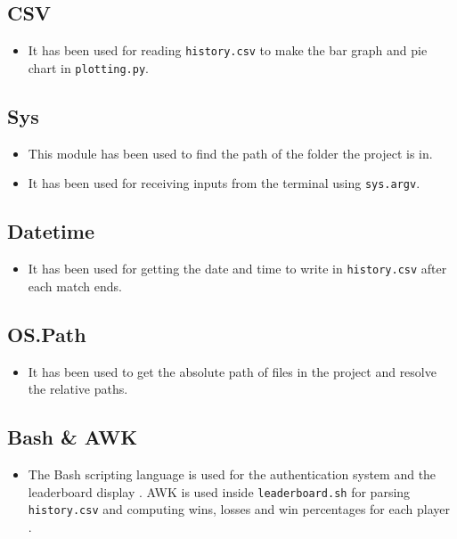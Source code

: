 \documentclass[12pt,a4paper]{article}
\begin{document}
\subsection{CSV}
\begin{itemize}
    \item It has been used for reading \texttt{history.csv} to make the bar graph and pie chart in \texttt{plotting.py}.
\end{itemize}

\subsection{Sys}
\begin{itemize}
    \item This module has been used to find the path of the folder the project is in.
    \item It has been used for receiving inputs from the terminal using \texttt{sys.argv}.

\end{itemize}

\subsection{Datetime}
\begin{itemize}
    \item It has been used for getting the date and time to write in \texttt{history.csv} after each match ends.
\end{itemize}

\subsection{OS.Path}
\begin{itemize}
    \item It has been used to get the absolute path of files in the project and resolve the relative paths.
\end{itemize}


\subsection{Bash \& AWK}
\begin{itemize}
    \item The Bash scripting language is used for the authentication system and the leaderboard display \cite{bashref}. AWK is used inside \texttt{leaderboard.sh} for parsing \texttt{history.csv} and computing wins, losses and win percentages for each player \cite{awk_docs}.
\end{itemize}
\end{document}
